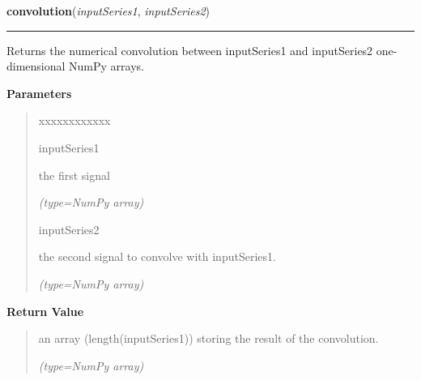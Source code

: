     \label{nMOLDYN:Core:Mathematics:convolution}

    \vspace{0.5ex}

\hspace{.8\funcindent}\begin{boxedminipage}{\funcwidth}

    \raggedright \textbf{convolution}(\textit{inputSeries1}, \textit{inputSeries2})

    \vspace{-1.5ex}

    \rule{\textwidth}{0.5\fboxrule}
\setlength{\parskip}{2ex}
    Returns the numerical convolution between 
    {\textbar}inputSeries1{\textbar} and {\textbar}inputSeries2{\textbar} 
    one-dimensional NumPy arrays.

\setlength{\parskip}{1ex}
      \textbf{Parameters}
      \vspace{-1ex}

      \begin{quote}
        \begin{Ventry}{xxxxxxxxxxxx}

          \item[inputSeries1]

          the first signal

            {\it (type=NumPy array)}

          \item[inputSeries2]

          the second signal to convolve with 
          {\textbar}inputSeries1{\textbar}.

            {\it (type=NumPy array)}

        \end{Ventry}

      \end{quote}

      \textbf{Return Value}
    \vspace{-1ex}

      \begin{quote}
      an array (length({\textbar}inputSeries1{\textbar})) storing the 
      result of the convolution.

      {\it (type=NumPy array)}

      \end{quote}


\end{boxedminipage}

